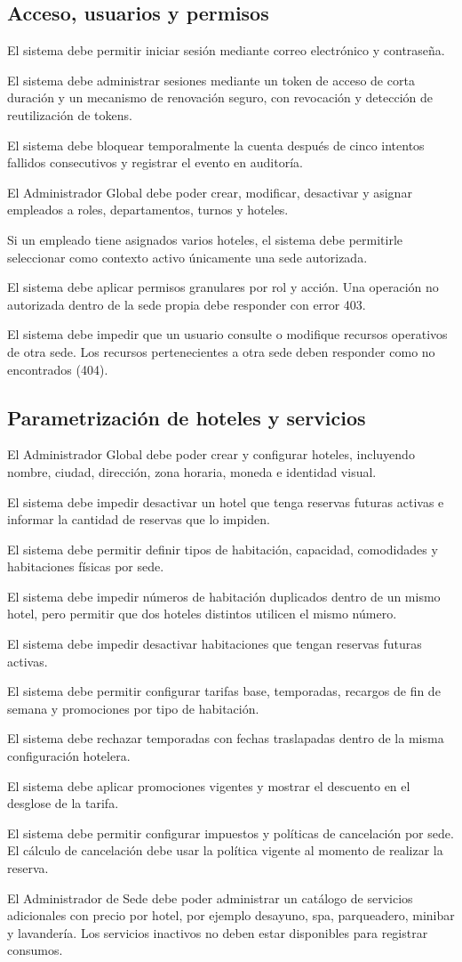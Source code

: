 \documentclass[12pt,a4paper]{article}
\newcommand{\RF}[2]{\item[\textbf{#1}] #2}
\begin{document}
\subsection{Acceso, usuarios y permisos}
\begin{description}[leftmargin=2.1cm,style=nextline]
  \RF{RF-01}{El sistema debe permitir iniciar sesión mediante correo electrónico y contraseña.}
  \RF{RF-02}{El sistema debe administrar sesiones mediante un token de acceso de corta duración y un mecanismo de renovación seguro, con revocación y detección de reutilización de tokens.}
  \RF{RF-03}{El sistema debe bloquear temporalmente la cuenta después de cinco intentos fallidos consecutivos y registrar el evento en auditoría.}
  \RF{RF-04}{El Administrador Global debe poder crear, modificar, desactivar y asignar empleados a roles, departamentos, turnos y hoteles.}
  \RF{RF-05}{Si un empleado tiene asignados varios hoteles, el sistema debe permitirle seleccionar como contexto activo únicamente una sede autorizada.}
  \RF{RF-06}{El sistema debe aplicar permisos granulares por rol y acción. Una operación no autorizada dentro de la sede propia debe responder con error 403.}
  \RF{RF-07}{El sistema debe impedir que un usuario consulte o modifique recursos operativos de otra sede. Los recursos pertenecientes a otra sede deben responder como no encontrados (404).}
\end{description}

\subsection{Parametrización de hoteles y servicios}
\begin{description}[leftmargin=2.1cm,style=nextline]
  \RF{RF-08}{El Administrador Global debe poder crear y configurar hoteles, incluyendo nombre, ciudad, dirección, zona horaria, moneda e identidad visual.}
  \RF{RF-09}{El sistema debe impedir desactivar un hotel que tenga reservas futuras activas e informar la cantidad de reservas que lo impiden.}
  \RF{RF-10}{El sistema debe permitir definir tipos de habitación, capacidad, comodidades y habitaciones físicas por sede.}
  \RF{RF-11}{El sistema debe impedir números de habitación duplicados dentro de un mismo hotel, pero permitir que dos hoteles distintos utilicen el mismo número.}
  \RF{RF-12}{El sistema debe impedir desactivar habitaciones que tengan reservas futuras activas.}
  \RF{RF-13}{El sistema debe permitir configurar tarifas base, temporadas, recargos de fin de semana y promociones por tipo de habitación.}
  \RF{RF-14}{El sistema debe rechazar temporadas con fechas traslapadas dentro de la misma configuración hotelera.}
  \RF{RF-15}{El sistema debe aplicar promociones vigentes y mostrar el descuento en el desglose de la tarifa.}
  \RF{RF-16}{El sistema debe permitir configurar impuestos y políticas de cancelación por sede. El cálculo de cancelación debe usar la política vigente al momento de realizar la reserva.}
  \RF{RF-17}{El Administrador de Sede debe poder administrar un catálogo de servicios adicionales con precio por hotel, por ejemplo desayuno, spa, parqueadero, minibar y lavandería. Los servicios inactivos no deben estar disponibles para registrar consumos.}
\end{description}
\end{document}
